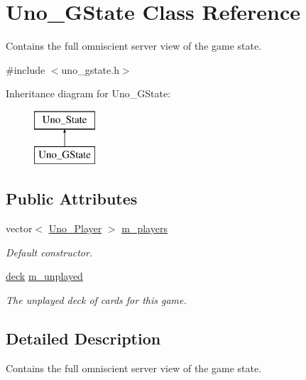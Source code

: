 \hypertarget{class_uno___g_state}{
\section{\-Uno\-\_\-\-G\-State \-Class \-Reference}
\label{class_uno___g_state}
}


\-Contains the full omniscient server view of the game state.  




{\ttfamily \#include $<$uno\-\_\-gstate.\-h$>$}

\-Inheritance diagram for \-Uno\-\_\-\-G\-State\-:\begin{figure}[H]
\begin{center}
\leavevmode
\includegraphics[height=2.000000cm]{class_uno___g_state}
\end{center}
\end{figure}
\subsection*{\-Public \-Attributes}
\begin{DoxyCompactItemize}
\item 
vector$<$ \hyperlink{class_uno___player}{\-Uno\-\_\-\-Player} $>$ \hyperlink{class_uno___g_state_acf0593a856c85059d8bd6bc71ee3165c}{m\-\_\-players}
\begin{DoxyCompactList}\small\item\em \-Default constructor. \end{DoxyCompactList}\item 
\hyperlink{uno__deck_8h_ab634a15f4d19d3af113a71241b79c408}{deck} \hyperlink{class_uno___g_state_afcc8256ce8ae779aa3e529f33a8818c1}{m\-\_\-unplayed}
\begin{DoxyCompactList}\small\item\em \-The unplayed deck of cards for this game. \end{DoxyCompactList}\end{DoxyCompactItemize}


\subsection{\-Detailed \-Description}
\-Contains the full omniscient server view of the game state. 

